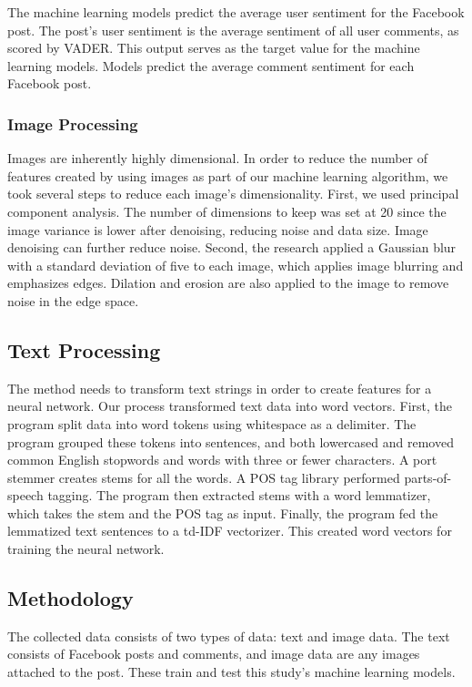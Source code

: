 \documentclass{article}
\begin{document}
The machine learning models predict the average user sentiment for the Facebook post. The post's user sentiment is the average sentiment of all user comments, as scored by VADER. This output serves as the target value for the machine learning models. Models predict the average comment sentiment for each Facebook post.

\subsubsection{Image Processing}
Images are inherently highly dimensional. In order to reduce the number of features created by using images as part of our machine learning algorithm, we took several steps to reduce each image's dimensionality. First, we used principal component analysis. The number of dimensions to keep was set at 20 since the image variance is lower after denoising, reducing noise and data size. Image denoising can further reduce noise. Second, the research applied a Gaussian blur with a standard deviation of five to each image, which applies image blurring and emphasizes edges. Dilation and erosion are also applied to the image to remove noise in the edge space.

\subsection{Text Processing}
The method needs to transform text strings in order to create features for a neural network. Our process transformed text data into word vectors. First, the program split data into word tokens using whitespace as a delimiter. The program grouped these tokens into sentences, and both lowercased and removed common English stopwords and words with three or fewer characters. A port stemmer creates stems for all the words. A POS tag library performed parts-of-speech tagging. The program then extracted stems with a word lemmatizer, which takes the stem and the POS tag as input. Finally, the program fed the lemmatized text sentences to a td-IDF vectorizer. This created word vectors for training the neural network.

\subsection{Methodology}
The collected data consists of two types of data: text and image data. The text consists of Facebook posts and comments, and image data are any images attached to the post. These train and test this study's machine learning models. 
\end{document}

